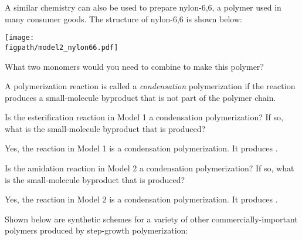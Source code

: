 \begin{activity}
\begin{ctqs}
		\clearpage
		\question A similar chemistry can also be used to prepare nylon-6,6, a polymer used in many consumer goods.
		The structure of nylon-6,6 is shown below:
		
			\centerline{\texttt{[image: \\figpath/model2\_nylon66.pdf]}}
			
		What two monomers would you need to combine to make this polymer?
			
				\begin{solution}[2in]
				\end{solution}
			
\end{ctqs}
	
\begin{infobox}

A polymerization reaction is called a \emph{condensation} polymerization if the reaction produces a small-molecule byproduct that is not part of the polymer chain.

\end{infobox}
	
\begin{ctqs}
		\question Is the esterification reaction in Model 1 a condensation polymerization?  If so, what is the small-molecule byproduct that is produced?
			
				\begin{solution}[1in]
					Yes, the reaction in Model 1 is a condensation polymerization. It produces .
				\end{solution}
		
		\question Is the amidation reaction in Model 2 a condensation polymerization?  If so, what is the small-molecule byproduct that is produced?
			
				\begin{solution}[1in]
					Yes, the reaction in Model 2 is a condensation polymerization. It produces .
				\end{solution}
		
\end{ctqs}

\begin{model}
\label{\labelbase:model:otherstepgrowthchems}

Shown below are synthetic schemes for a variety of other commercially-important polymers produced by step-growth polymerization:


\end{model}
\end{activity}
